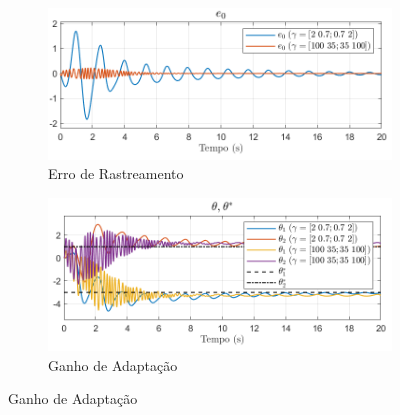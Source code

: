 \documentclass[10pt]{article}
\begin{document}
\begin{figure}[h!]
    \centering
    \begin{subfigure}[b]{0.25\textwidth}
        \centering
        \includegraphics[width=\textwidth]{img/fig10a.png}
        \caption{Erro de Rastreamento}
    \end{subfigure}
    \begin{subfigure}[b]{0.25\textwidth}
        \centering
        \includegraphics[width=\textwidth]{img/fig10b.png}
        \caption{Ganho de Adaptação}
    \end{subfigure}


\end{figure}
\end{document}
